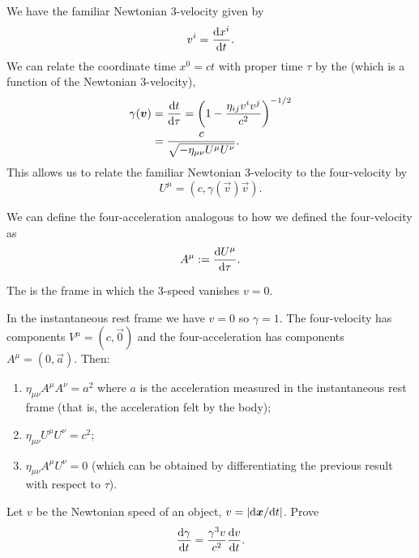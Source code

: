 We have the familiar Newtonian 3-velocity given by
\begin{equation}
v^{i} = \frac{\mathrm{d} x^{i}}{\mathrm{d} t}.
\end{equation}
We can relate the coordinate time $x^{0}=ct$ with proper time $\tau$ by
the  (which is a function of the Newtonian 3-velocity),
\begin{equation}
  \begin{split}
\gamma(\boldsymbol{v}) &= \frac{\mathrm{d} t}{\mathrm{d}\tau} = \left(1 - \frac{\eta_{ij}v^{i}v^{j}}{c^{2}}\right)^{-1/2}\\
&=\frac{c}{\sqrt{-\eta_{\mu\nu}U^{\mu}U^{\nu}}}.
  \end{split}
\end{equation}
This allows us to relate the familiar Newtonian 3-velocity
to the four-velocity by
\begin{equation}
U^{\mu} = (c, \gamma(\vec{v})\vec{v}).
\end{equation}

We can define the four-acceleration analogous to how we defined the
four-velocity as
\begin{equation}
A^{\mu} := \frac{\mathrm{d} U^{\mu}}{\mathrm{d}\tau}.
\end{equation}

\begin{definition}
The  is the frame in which the 3-speed vanishes $v=0$.
\end{definition}

\M
In the instantaneous rest frame we have $v=0$ so $\gamma=1$. The
four-velocity has components $V^{\mu}=(c,\vec{0})$ and the
four-acceleration has components $A^{\mu}=(0,\vec{a})$. Then:
\begin{enumerate}
\item $\eta_{\mu\nu}A^{\mu}A^{\nu}=a^{2}$ where $a$ is the acceleration
  measured in the instantaneous rest frame (that is, the acceleration
  felt by the body);
\item $\eta_{\mu\nu}U^{\mu}U^{\nu}=c^{2}$;
\item $\eta_{\mu\nu}A^{\mu}U^{\nu}=0$ (which can be obtained by
  differentiating the previous result with respect to $\tau$).
\end{enumerate}

\begin{exercise}
Let $v$ be the Newtonian speed of an object, $v = |\mathrm{d}\boldsymbol{x}/\mathrm{d} t|$.
Prove
\begin{equation*}
\frac{\mathrm{d}\gamma}{\mathrm{d} t} = \frac{\gamma^{3}v}{c^{2}}\frac{\mathrm{d} v}{\mathrm{d} t}.
\end{equation*}
\end{exercise}

